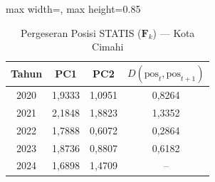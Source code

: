 \begin{table}[H]
\centering
\caption{Pergeseran Posisi STATIS ($\mathbf{F}_k$) --- Kota Cimahi} \label{tab:app2jarak_statis_skor_kota_cimahi}
\begin{adjustbox}{max width=\textwidth, max height=0.85\textheight}
\begin{tabular}{|c|c|c|c|}
\hline
\textbf{Tahun} & \textbf{PC1} & \textbf{PC2} & \textbf{$D(\text{pos}_t, \text{pos}_{t+1})$} \\
\hline
2020 & 1,9333 & 1,0951 & 0,8264 \\
2021 & 2,1848 & 1,8823 & 1,3352 \\
2022 & 1,7888 & 0,6072 & 0,2864 \\
2023 & 1,8736 & 0,8807 & 0,6182 \\
2024 & 1,6898 & 1,4709 & -- \\
\hline
\end{tabular}
\end{adjustbox}
\end{table}
